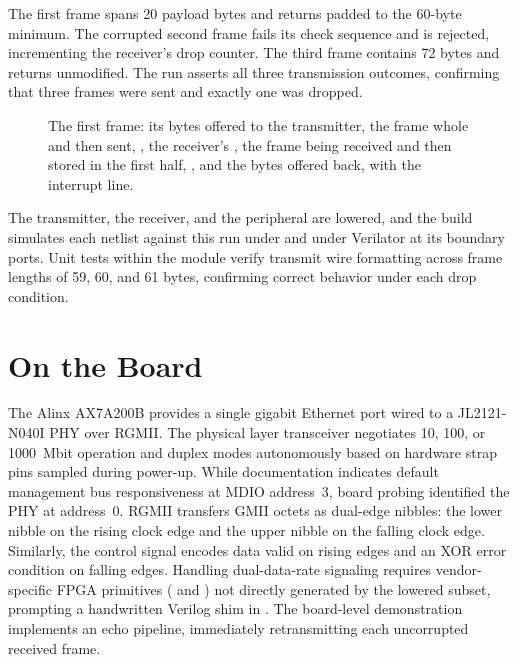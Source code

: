 \documentclass[journal,9pt]{IEEEtran}
\begin{document}
The first frame spans 20 payload bytes and returns padded to the 60-byte
minimum. The corrupted second frame fails its check sequence and is
rejected, incrementing the receiver's drop counter. The third frame
contains 72 bytes and returns unmodified. The run asserts all three
transmission outcomes, confirming that three frames were sent and exactly
one was dropped.

\begin{figure}[t]
\centering

\caption{The first frame: its bytes offered to the transmitter, the
frame whole and then sent, , the receiver's
, the frame being received and then stored in the first
half, , and the bytes
offered back, with the interrupt line.}
\label{fig:e-run}
\end{figure}





The transmitter, the receiver, and the peripheral are lowered, and the build
simulates each netlist against this run under  and under Verilator
at its boundary ports. Unit tests within the module verify transmit wire
formatting across frame lengths of 59, 60, and 61 bytes, confirming correct
behavior under each drop condition.

\section{On the Board}
\label{sec:e-board}

The Alinx AX7A200B provides a single gigabit Ethernet port wired to a
JL2121-N040I PHY over RGMII. The physical layer transceiver negotiates
10, 100, or 1000~Mbit operation and duplex modes autonomously based on
hardware strap pins sampled during power-up. While documentation indicates
default management bus responsiveness at MDIO address~3, board probing
identified the PHY at address~0. RGMII transfers GMII octets as dual-edge
nibbles: the lower nibble on the rising clock edge and the upper nibble
on the falling clock edge. Similarly, the control signal encodes data
valid on rising edges and an XOR error condition on falling edges.
Handling dual-data-rate signaling requires vendor-specific FPGA primitives
( and ) not directly generated by the lowered
subset, prompting a handwritten Verilog shim in . The
board-level demonstration implements an echo pipeline, immediately
retransmitting each uncorrupted received frame.
\end{document}
